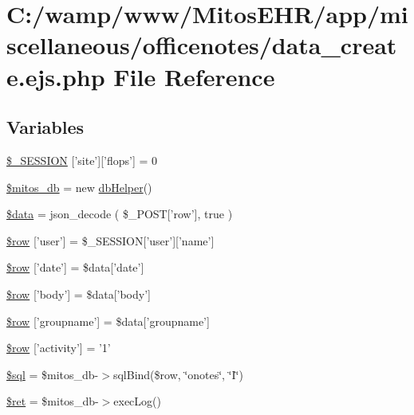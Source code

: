 \hypertarget{miscellaneous_2officenotes_2data__create_8ejs_8php}{\section{\-C\-:/wamp/www/\-Mitos\-E\-H\-R/app/miscellaneous/officenotes/data\-\_\-create.ejs.\-php \-File \-Reference}
\label{miscellaneous_2officenotes_2data__create_8ejs_8php}
}
\subsection*{\-Variables}
\begin{DoxyCompactItemize}
\item 
\hyperlink{miscellaneous_2officenotes_2data__create_8ejs_8php_a99fda8552a3e58235643b79f5af3ded8}{\$\-\_\-\-S\-E\-S\-S\-I\-O\-N} \mbox{[}'site'\mbox{]}\mbox{[}'flops'\mbox{]} = 0
\item 
\hyperlink{miscellaneous_2officenotes_2data__create_8ejs_8php_ab5d961f93efe4e2e8d8374f01dd6c65a}{\$mitos\-\_\-db} = new \hyperlink{classdb_helper}{db\-Helper}()
\item 
\hyperlink{miscellaneous_2officenotes_2data__create_8ejs_8php_a6efc15b5a2314dd4b5aaa556a375c6d6}{\$data} = json\-\_\-decode ( \$\-\_\-\-P\-O\-S\-T\mbox{[}'row'\mbox{]}, true )
\item 
\hyperlink{miscellaneous_2officenotes_2data__create_8ejs_8php_a8756f3951330e77caadc30664962ec6b}{\$row} \mbox{[}'user'\mbox{]} = \$\-\_\-\-S\-E\-S\-S\-I\-O\-N\mbox{[}'user'\mbox{]}\mbox{[}'name'\mbox{]}
\item 
\hyperlink{miscellaneous_2officenotes_2data__create_8ejs_8php_a00cef09db665c491099e0754691dde2e}{\$row} \mbox{[}'date'\mbox{]} = \$data\mbox{[}'date'\mbox{]}
\item 
\hyperlink{miscellaneous_2officenotes_2data__create_8ejs_8php_abfa083185dbcb265fcba9aeecceb0b8e}{\$row} \mbox{[}'body'\mbox{]} = \$data\mbox{[}'body'\mbox{]}
\item 
\hyperlink{miscellaneous_2officenotes_2data__create_8ejs_8php_a488a83d63cb6f5d9d30028466b499787}{\$row} \mbox{[}'groupname'\mbox{]} = \$data\mbox{[}'groupname'\mbox{]}
\item 
\hyperlink{miscellaneous_2officenotes_2data__create_8ejs_8php_a451ec54fca28dee6d377a2ae931d892f}{\$row} \mbox{[}'activity'\mbox{]} = '1'
\item 
\hyperlink{miscellaneous_2officenotes_2data__create_8ejs_8php_a047170d6020a882807665812a27e2525}{\$sql} = \$mitos\-\_\-db-\/$>$sql\-Bind(\$row, \char`\"{}onotes\char`\"{}, \char`\"{}\-I\char`\"{})
\item 
\hyperlink{miscellaneous_2officenotes_2data__create_8ejs_8php_affd9e3eb0aad0a7ca42912cd925f148c}{\$ret} = \$mitos\-\_\-db-\/$>$exec\-Log()
\end{DoxyCompactItemize}


